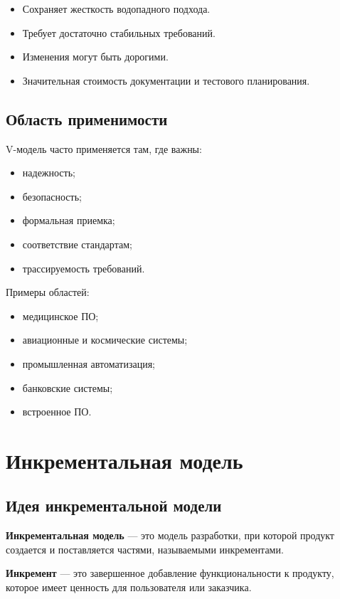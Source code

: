 \documentclass[12pt,a4paper]{article}
\begin{document}
\begin{itemize}
    \item Сохраняет жесткость водопадного подхода.
    \item Требует достаточно стабильных требований.
    \item Изменения могут быть дорогими.
    \item Значительная стоимость документации и тестового планирования.
\end{itemize}

\subsection{Область применимости}

V-модель часто применяется там, где важны:
\begin{itemize}
    \item надежность;
    \item безопасность;
    \item формальная приемка;
    \item соответствие стандартам;
    \item трассируемость требований.
\end{itemize}

Примеры областей:
\begin{itemize}
    \item медицинское ПО;
    \item авиационные и космические системы;
    \item промышленная автоматизация;
    \item банковские системы;
    \item встроенное ПО.
\end{itemize}

\section{Инкрементальная модель}

\subsection{Идея инкрементальной модели}

\textbf{Инкрементальная модель} --- это модель разработки, при которой продукт создается и поставляется частями, называемыми инкрементами.

\textbf{Инкремент} --- это завершенное добавление функциональности к продукту, которое имеет ценность для пользователя или заказчика.
\end{document}
